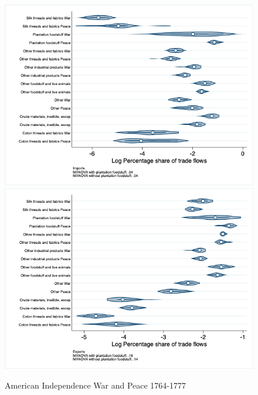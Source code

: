 \documentclass[12pt,a4paper,notitlepage,english]{article}
\begin{document}
\begin{figure}
\centering
\caption{American Independence War and Peace 1764-1777}
\label{peace1764_1777_indep_nat_distr_aggr}
\includegraphics[scale=.4]{peace1764_1777_indep_nat_distr_Iaggr}
\includegraphics[scale=.4]{peace1764_1777_indep_nat_distr_Xaggr}
\end{figure}
\end{document}
